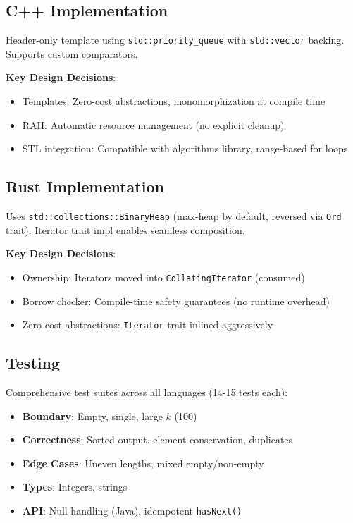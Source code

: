 \documentclass[11pt]{article}
\begin{document}
\subsection{C++ Implementation}

Header-only template using \texttt{std::priority\_queue} with \texttt{std::vector} backing. Supports custom comparators.

\textbf{Key Design Decisions}:
\begin{itemize}
    \item Templates: Zero-cost abstractions, monomorphization at compile time
    \item RAII: Automatic resource management (no explicit cleanup)
    \item STL integration: Compatible with algorithms library, range-based for loops
\end{itemize}

\subsection{Rust Implementation}

Uses \texttt{std::collections::BinaryHeap} (max-heap by default, reversed via \texttt{Ord} trait). Iterator trait impl enables seamless composition.

\textbf{Key Design Decisions}:
\begin{itemize}
    \item Ownership: Iterators moved into \texttt{CollatingIterator} (consumed)
    \item Borrow checker: Compile-time safety guarantees (no runtime overhead)
    \item Zero-cost abstractions: \texttt{Iterator} trait inlined aggressively
\end{itemize}

\subsection{Testing}

Comprehensive test suites across all languages (14-15 tests each):
\begin{itemize}
    \item \textbf{Boundary}: Empty, single, large $k$ (100)
    \item \textbf{Correctness}: Sorted output, element conservation, duplicates
    \item \textbf{Edge Cases}: Uneven lengths, mixed empty/non-empty
    \item \textbf{Types}: Integers, strings
    \item \textbf{API}: Null handling (Java), idempotent \texttt{hasNext()}
\end{itemize}
\end{document}
